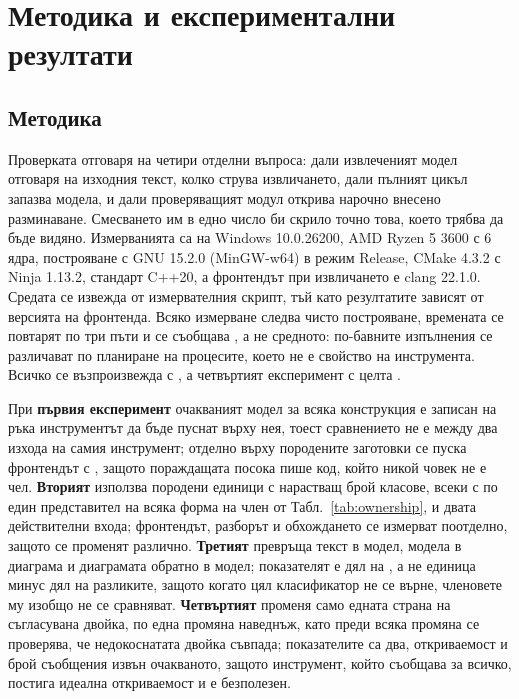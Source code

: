 \section{Методика и експериментални резултати}
\label{sec:method}

\subsection{Методика}

Проверката отговаря на четири отделни въпроса: дали извлеченият модел отговаря на изходния текст, колко
струва извличането, дали пълният цикъл запазва модела, и дали проверяващият модул открива нарочно
внесено разминаване. Смесването им в едно число би скрило точно това, което трябва да бъде видяно.
Измерванията са на Windows 10.0.26200, AMD Ryzen 5 3600 с 6 ядра, построяване с GNU 15.2.0
(MinGW-w64) в режим Release, CMake 4.3.2 с Ninja 1.13.2, стандарт C++20, а фронтендът при извличането
е clang 22.1.0. Средата се извежда от измервателния скрипт, тъй като резултатите зависят от версията
на фронтенда. Всяко измерване следва чисто построяване, времената се повтарят по три пъти и се
съобщава , а не средното: по-бавните изпълнения се различават по планиране на
процесите, което не е свойство на инструмента. Всичко се възпроизвежда с , а четвъртият експеримент с целта .

При \textbf{първия експеримент} очакваният модел за всяка конструкция е записан на ръка 
инструментът да бъде пуснат върху нея, тоест сравнението не е между два изхода на самия инструмент;
отделно върху породените заготовки се пуска фронтендът с , защото пораждащата
посока пише код, който никой човек не е чел. \textbf{Вторият} използва породени единици с нарастващ
брой класове, всеки с по един представител на всяка форма на член от Табл.~\ref{tab:ownership}, и двата
действителни входа; фронтендът, разборът и обхождането се измерват поотделно, защото се променят
различно. \textbf{Третият} превръща текст в модел, модела в диаграма и диаграмата обратно в модел;
показателят е дял на , а не единица минус дял на разликите, защото когато цял
класификатор не се върне, членовете му изобщо не се сравняват. \textbf{Четвъртият} променя само едната
страна на съгласувана двойка, по една промяна наведнъж, като преди всяка промяна се проверява, че
недокоснатата двойка съвпада; показателите са два, откриваемост и брой съобщения извън очакваното,
защото инструмент, който съобщава за всичко, постига идеална откриваемост и е безполезен.
